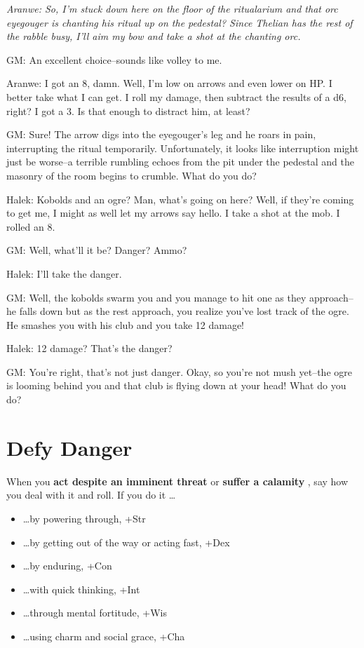 {\itshape
 Aranwe: So, I'm stuck down here on the floor of the ritualarium and that orc eyegouger is chanting his ritual up on the pedestal? Since Thelian has the rest of the rabble busy, I'll aim my bow and take a shot at the chanting orc.


 GM: An excellent choice--sounds like volley to me.


 Aranwe: I got an 8, damn. Well, I'm low on arrows and even lower on HP\@. I better take what I can get. I roll my damage, then subtract the results of a d6, right? I got a 3. Is that enough to distract him, at least?


 GM: Sure! The arrow digs into the eyegouger's leg and he roars in pain, interrupting the ritual temporarily. Unfortunately, it looks like interruption might just be worse--a terrible rumbling echoes from the pit under the pedestal and the masonry of the room begins to crumble. What do you do?


 Halek: Kobolds and an ogre? Man, what's going on here? Well, if they're coming to get me, I might as well let my arrows say hello. I take a shot at the mob. I rolled an 8.


 GM: Well, what'll it be? Danger? Ammo?


 Halek: I'll take the danger.


 GM: Well, the kobolds swarm you and you manage to hit one as they approach--he falls down but as the rest approach, you realize you've lost track of the ogre. He smashes you with his club and you take 12 damage!


 Halek: 12 damage? That's the danger?


 GM: You're right, that's not just danger. Okay, so you're not mush yet--the ogre is looming behind you and that club is flying down at your head! What do you do?
 }
\section*{Defy Danger}
\HRule
 When you \textbf{act despite an imminent threat}
 or \textbf{suffer a calamity}
, say how you deal with it and roll. If you do it \ldots 
\begin{itemize}
\item  \ldots by powering through, +Str
\item  \ldots by getting out of the way or acting fast, +Dex
\item  \ldots by enduring, +Con
\item  \ldots with quick thinking, +Int
\item  \ldots through mental fortitude, +Wis
\item  \ldots using charm and social grace, +Cha
\end{itemize}
\HRule

